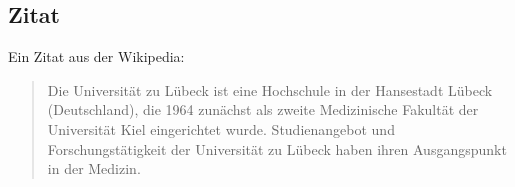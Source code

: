 \subsection{Zitat}

Ein Zitat aus der Wikipedia:

\begin{quote}
	\begin{myquote}
		Die Universität zu Lübeck ist eine Hochschule in der Hansestadt Lübeck (Deutschland), die 1964 zunächst als zweite Medizinische Fakultät der Universität Kiel eingerichtet wurde. Studienangebot und Forschungstätigkeit der Universität zu Lübeck haben ihren Ausgangspunkt in der Medizin.
		\label{quote:uni}
	\end{myquote}
\end{quote}


%
%


